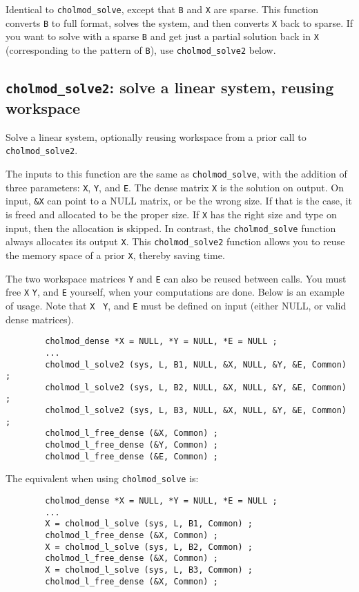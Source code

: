 \documentclass[11pt]{article}
\begin{document}

Identical to {\tt cholmod\_solve}, except that {\tt B} and {\tt X} are sparse.
This function converts {\tt B} to full format, solves the system, and then
converts {\tt X} back to sparse.  If you want to solve with a sparse {\tt B}
and get just a partial solution back in {\tt X} (corresponding to the pattern
of {\tt B}), use {\tt cholmod\_solve2} below.

\subsection{{\tt cholmod\_solve2}: solve a linear system, reusing workspace}


Solve a linear system, optionally reusing workspace from a prior call
to {\tt cholmod\_solve2}.

The inputs to this function are the same as {\tt cholmod\_solve}, with the
addition of three parameters: {\tt X}, {\tt Y}, and {\tt E}.  The dense matrix
{\tt X} is the solution on output.  On input, {\tt \&X} can point to a NULL
matrix, or be the wrong size.  If that is the case, it is freed and allocated
to be the proper size.  If {\tt X} has the right size and type on input, then
the allocation is skipped.  In contrast, the {\tt cholmod\_solve} function
always allocates its output {\tt X}.  This {\tt cholmod\_solve2} function
allows you to reuse the memory space of a prior {\tt X}, thereby saving time.

The two workspace matrices {\tt Y} and {\tt E} can also be reused between
calls.  You must free {\tt X} {\tt Y}, and {\tt E} yourself, when your
computations are done.  Below is an example of usage.  Note that {\tt X} {\tt
Y}, and {\tt E} must be defined on input (either NULL, or valid dense
matrices).

\begin{verbatim}
        cholmod_dense *X = NULL, *Y = NULL, *E = NULL ;
        ...
        cholmod_l_solve2 (sys, L, B1, NULL, &X, NULL, &Y, &E, Common) ;
        cholmod_l_solve2 (sys, L, B2, NULL, &X, NULL, &Y, &E, Common) ;
        cholmod_l_solve2 (sys, L, B3, NULL, &X, NULL, &Y, &E, Common) ;
        cholmod_l_free_dense (&X, Common) ;
        cholmod_l_free_dense (&Y, Common) ;
        cholmod_l_free_dense (&E, Common) ;
\end{verbatim}

The equivalent when using {\tt cholmod\_solve} is:

\begin{verbatim}
        cholmod_dense *X = NULL, *Y = NULL, *E = NULL ;
        ...
        X = cholmod_l_solve (sys, L, B1, Common) ;
        cholmod_l_free_dense (&X, Common) ;
        X = cholmod_l_solve (sys, L, B2, Common) ;
        cholmod_l_free_dense (&X, Common) ;
        X = cholmod_l_solve (sys, L, B3, Common) ;
        cholmod_l_free_dense (&X, Common) ;
\end{verbatim}
\end{document}
